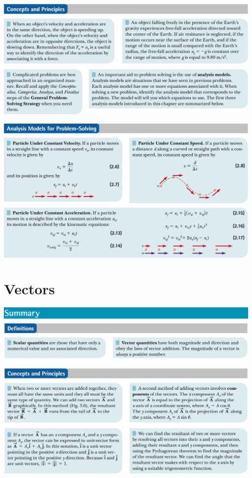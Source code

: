 \documentclass[12pt,a4paper]{article}
\newcommand{\N}{\noindent}
\begin{document}
		\vspace{2mm}
		\N \includegraphics[scale=.42]{2_c.png}
		
		\vspace{2mm}
		\N \includegraphics[scale=.42]{2_d.png}
		
	\section{Vectors}
		\N \includegraphics[scale=.42]{3.png}
		
\end{document}
